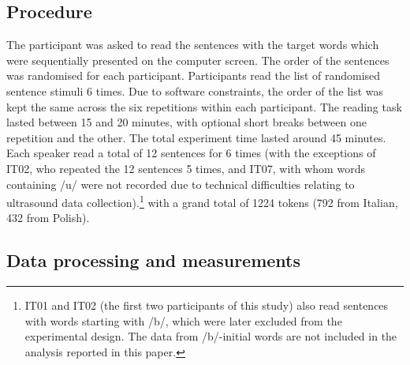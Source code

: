 \documentclass[preprint]{JASAnew}
\begin{document}
\hypertarget{procedure}{%
\subsection{Procedure}\label{procedure}}

The participant was asked to read the sentences with the target words
which were sequentially presented on the computer screen. The order of
the sentences was randomised for each participant. Participants read the
list of randomised sentence stimuli 6 times. Due to software
constraints, the order of the list was kept the same across the six
repetitions within each participant. The reading task lasted between 15
and 20 minutes, with optional short breaks between one repetition and
the other. The total experiment time lasted around 45 minutes. Each
speaker read a total of 12 sentences for 6 times (with the exceptions of
IT02, who repeated the 12 sentences 5 times, and IT07, with whom words
containing /u/ were not recorded due to technical difficulties relating
to ultrasound data
collection).\footnote{IT01 and IT02 (the first two participants of this study) also read sentences with words starting with /b/, which were later excluded from the experimental design. The data from /b/-initial words are not included in the analysis reported in this paper.}
with a grand total of 1224 tokens (792 from Italian, 432 from Polish).

\hypertarget{data-processing-and-measurements}{%
\subsection{Data processing and
measurements}\label{data-processing-and-measurements}}

\end{document}
